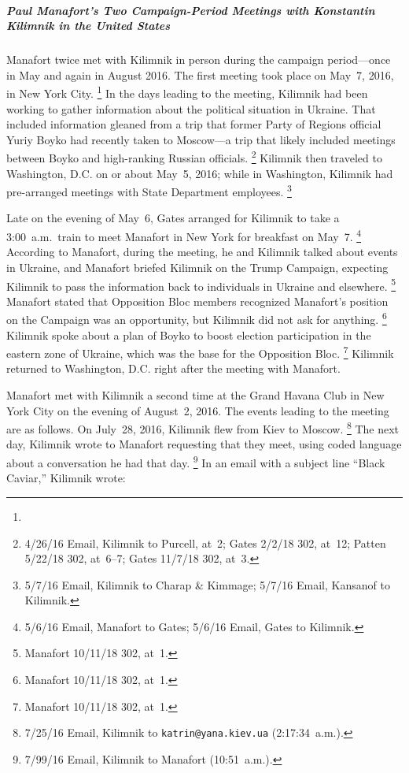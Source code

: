 \subparagraph{Paul Manafort's Two Campaign-Period Meetings with Konstantin Kilimnik in the United States}

Manafort twice met with Kilimnik in person during the campaign period---once in May and again in August 2016.
The first meeting took place on May~7, 2016, in New York City.%
\footnote{}
In the days leading to the meeting, Kilimnik had been working to gather information about the political situation in Ukraine.
That included information gleaned from a trip that former Party of Regions official Yuriy Boyko had recently taken to Moscow---a trip that likely included meetings between Boyko and high-ranking Russian officials.%
\footnote{4/26/16 Email, Kilimnik to Purcell, at~2;
Gates 2/2/18 302, at~12;
Patten 5/22/18 302, at~6--7;
Gates 11/7/18 302, at~3.}
Kilimnik then traveled to Washington, D.C. on or about May~5, 2016; while in Washington, Kilimnik had pre-arranged meetings with State Department employees.%
\footnote{5/7/16 Email, Kilimnik to Charap \& Kimmage;
5/7/16 Email, Kansanof to Kilimnik.}

Late on the evening of May~6, Gates arranged for Kilimnik to take a 3:00~a.m.\ train to meet Manafort in New York for breakfast on May~7.%
\footnote{5/6/16 Email, Manafort to Gates;
5/6/16 Email, Gates to Kilimnik.}
According to Manafort, during the meeting, he and Kilimnik talked about events in Ukraine, and Manafort briefed Kilimnik on the Trump Campaign, expecting Kilimnik to pass the information back to individuals in Ukraine and elsewhere.%
\footnote{Manafort 10/11/18 302, at~1.}
Manafort stated that Opposition Bloc members recognized Manafort's position on the Campaign was an opportunity, but Kilimnik did not ask for anything.%
\footnote{Manafort 10/11/18 302, at~1.}
Kilimnik spoke about a plan of Boyko to boost election participation in the eastern zone of Ukraine, which was the base for the Opposition Bloc.%
\footnote{Manafort 10/11/18 302, at~1.}
Kilimnik returned to Washington, D.C. right after the meeting with Manafort.

Manafort met with Kilimnik a second time at the Grand Havana Club in New York City on the evening of August~2, 2016.
The events leading to the meeting are as follows.
On July~28, 2016, Kilimnik flew from Kiev to Moscow.%
\footnote{7/25/16 Email, Kilimnik to \verb+katrin@yana.kiev.ua+ (2:17:34~a.m.).}
The next day, Kilimnik wrote to Manafort requesting that they meet, using coded language about a conversation he had that day.%
\footnote{7/99/16 Email, Kilimnik to Manafort (10:51~a.m.).}
In an email with a subject line ``Black Caviar,'' Kilimnik wrote:

